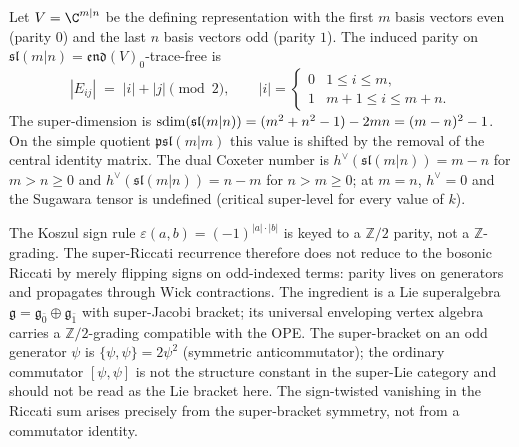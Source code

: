 \begin{definition}
\label{def:super-parity-sl-mn}
Let $V = \C^{m|n}$ be the defining representation with the first $m$
basis vectors even (parity $0$) and the last $n$ basis vectors odd
(parity $1$). The induced parity on
$\mathfrak{sl}(m|n) = \mathfrak{end}(V)_0$-trace-free is
\[
|E_{ij}| \;=\; |i| + |j| \pmod{2},
\qquad
|i| = \begin{cases} 0 & 1 \le i \le m, \\ 1 & m+1 \le i \le m + n. \end{cases}
\]
The super-dimension is
$\mathrm{sdim}(\mathfrak{sl}(m|n)) = (m^2 + n^2 - 1) - 2mn = (m - n)^2 - 1$.
On the simple quotient $\mathfrak{psl}(m|m)$ this value is shifted by
the removal of the central identity matrix.
The dual Coxeter number is $h^\vee(\mathfrak{sl}(m|n)) = m - n$
for $m > n \ge 0$ and $h^\vee(\mathfrak{sl}(m|n)) = n - m$ for $n > m \ge 0$;
at $m = n$, $h^\vee = 0$ and the Sugawara tensor is undefined (critical
super-level for every value of $k$).
\end{definition}

\begin{remark}
\label{rem:parity-grading-distinction}
The Koszul sign rule $\varepsilon(a, b) = (-1)^{|a| \cdot |b|}$ is
keyed to a $\mathbb{Z}/2$ parity, not a $\mathbb{Z}$-grading. The
super-Riccati recurrence therefore does not reduce to the bosonic
Riccati by merely flipping signs on odd-indexed terms: parity lives
on generators and propagates through Wick contractions. The
ingredient is a Lie superalgebra
$\mathfrak{g} = \mathfrak{g}_{\bar 0} \oplus \mathfrak{g}_{\bar 1}$
with super-Jacobi bracket; its universal enveloping vertex algebra
carries a $\mathbb{Z}/2$-grading compatible with the OPE. The
super-bracket on an odd generator $\psi$ is
$\{\psi, \psi\} = 2 \psi^2$ (symmetric anticommutator); the ordinary
commutator $[\psi, \psi]$ is not the structure constant in the
super-Lie category and should not be read as the Lie bracket here.
The sign-twisted vanishing in the Riccati sum arises precisely from
the super-bracket symmetry, not from a commutator identity.
\end{remark}

